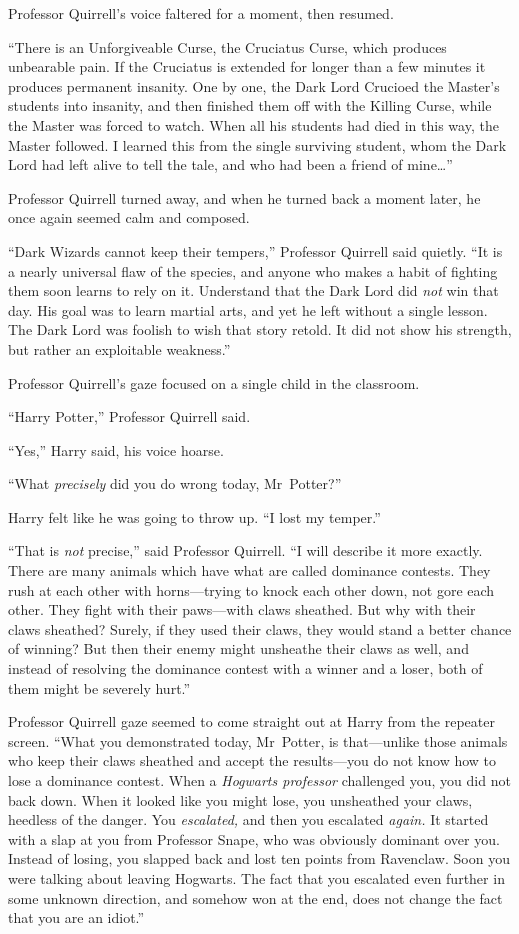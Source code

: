 Professor Quirrell’s voice faltered for a moment, then resumed.

“There is an Unforgiveable Curse, the Cruciatus Curse, which produces unbearable pain. If the Cruciatus is extended for longer than a few minutes it produces permanent insanity. One by one, the Dark Lord Crucioed the Master’s students into insanity, and then finished them off with the Killing Curse, while the Master was forced to watch. When all his students had died in this way, the Master followed. I learned this from the single surviving student, whom the Dark Lord had left alive to tell the tale, and who had been a friend of mine…”

Professor Quirrell turned away, and when he turned back a moment later, he once again seemed calm and composed.

“Dark Wizards cannot keep their tempers,” Professor Quirrell said quietly. “It is a nearly universal flaw of the species, and anyone who makes a habit of fighting them soon learns to rely on it. Understand that the Dark Lord did \emph{not} win that day. His goal was to learn martial arts, and yet he left without a single lesson. The Dark Lord was foolish to wish that story retold. It did not show his strength, but rather an exploitable weakness.”

Professor Quirrell’s gaze focused on a single child in the classroom.

“Harry Potter,” Professor Quirrell said.

“Yes,” Harry said, his voice hoarse.

“What \emph{precisely} did you do wrong today, Mr~Potter?”

Harry felt like he was going to throw up. “I lost my temper.”

“That is \emph{not} precise,” said Professor Quirrell. “I will describe it more exactly. There are many animals which have what are called dominance contests. They rush at each other with horns—trying to knock each other down, not gore each other. They fight with their paws—with claws sheathed. But why with their claws sheathed? Surely, if they used their claws, they would stand a better chance of winning? But then their enemy might unsheathe their claws as well, and instead of resolving the dominance contest with a winner and a loser, both of them might be severely hurt.”

Professor Quirrell gaze seemed to come straight out at Harry from the repeater screen. “What you demonstrated today, Mr~Potter, is that—unlike those animals who keep their claws sheathed and accept the results—you do not know how to lose a dominance contest. When a \emph{Hogwarts professor} challenged you, you did not back down. When it looked like you might lose, you unsheathed your claws, heedless of the danger. You \emph{escalated,} and then you escalated \emph{again.} It started with a slap at you from Professor Snape, who was obviously dominant over you. Instead of losing, you slapped back and lost ten points from Ravenclaw. Soon you were talking about leaving Hogwarts. The fact that you escalated even further in some unknown direction, and somehow won at the end, does not change the fact that you are an idiot.”

